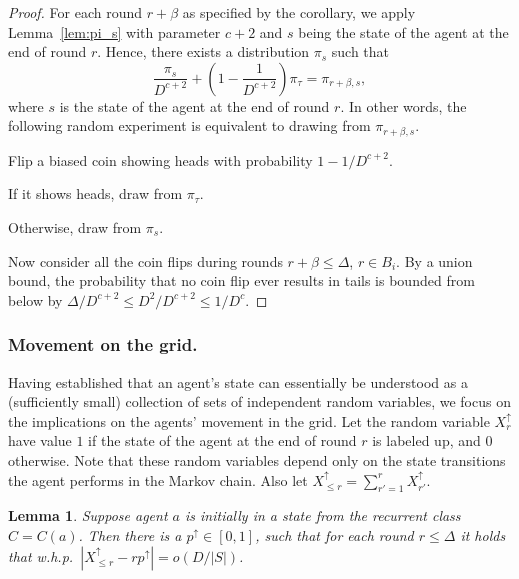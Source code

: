 \documentclass[11pt]{article}
\newtheorem{lemma}[theorem]{Lemma}
\begin{document}
\begin{proof}
For each round $r+\beta$ as specified by the corollary, we apply Lemma~\ref{lem:pi_s} with parameter $c+2$ and $s$ being the state of the agent at the end of round $r$. Hence, there exists a distribution $\pi_s$ such that
\begin{equation*}
\frac{\pi_{s}}{D^{c+2}} + \left(1 - \frac{1}{D^{c+2}}\right) \pi_{\tau} = \pi_{r+\beta,s},
\end{equation*}
where $s$ is the state of the agent at the end of round $r$. In other words, the following random experiment is equivalent to drawing from $\pi_{r+\beta,s}$.
\begin{compactenum}
\item Flip a biased coin showing heads with probability $1-1/D^{c+2}$.
\item If it shows heads, draw from $\pi_{\tau}$.
\item Otherwise, draw from $\pi_s$.
\end{compactenum}
Now consider all the coin flips during rounds $r+\beta\leq \Delta$, $r\in B_i$. By a union bound, the probability that no coin flip ever results in tails is bounded from below by $\Delta/D^{c+2}\leq D^2/D^{c+2}\leq 1/D^c$.
\end{proof}

\subsubsection{Movement on the grid.}
\label{sec:movement}

Having established that an agent's state can essentially be understood as a (sufficiently small) collection of sets of independent random variables, we focus on the implications on the agents' movement in the grid. Let the random variable $X_r^{\uparrow}$ have value $1$ if the state of the agent at the end of round $r$ is labeled up, and $0$ otherwise. Note that these random variables depend only on the state transitions the agent performs in the Markov chain. Also let $X_{\leq r}^{\uparrow} = \sum^{r}_{r'=1} X_{r'}^{\uparrow}$.

\begin{lemma}
\label{lem:upwards}
	Suppose agent $a$ is initially in a state from the recurrent class $C=C(a)$. Then there is a $p^{\uparrow}\in [0,1]$, such that for each round $r\leq \Delta$ it holds that w.h.p.\ $\left|X_{\leq r}^{\uparrow}-rp^{\uparrow}\right| = o(D/|S|)$.
\end{lemma}
\end{document}
